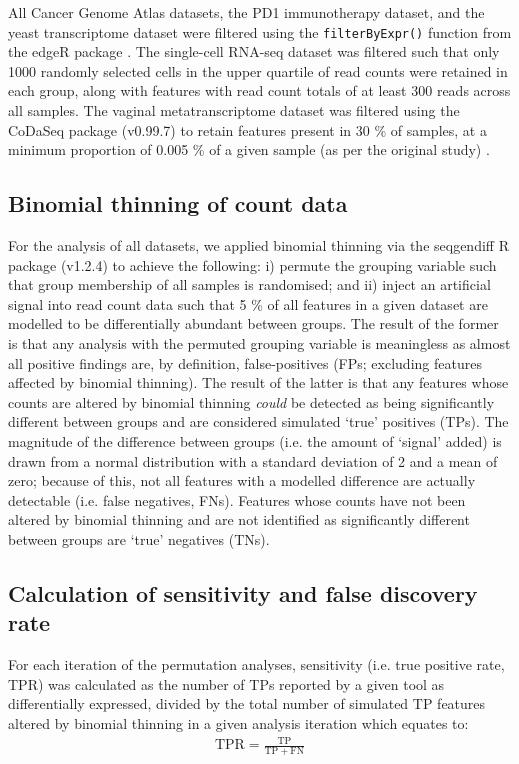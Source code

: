 \documentclass{article}
\begin{document}
All Cancer Genome Atlas datasets, the PD1 immunotherapy dataset, and the yeast transcriptome dataset were filtered using the \texttt{filterByExpr()} function from the edgeR package \cite{robinson_edger_2010}. The single-cell RNA-seq dataset was filtered such that only 1000 randomly selected cells in the upper quartile of read counts were retained in each group, along with features with read count totals of at least 300 reads across all samples. The vaginal metatranscriptome dataset was filtered using the CoDaSeq package (v0.99.7) \cite{gloor_codaseq} to retain features present in 30 \% of samples, at a minimum proportion of 0.005 \% of a given sample (as per the original study) \cite{dos_santos_vaginal_2024}.

\subsection{Binomial thinning of count data}
For the analysis of all datasets, we applied binomial thinning via the seqgendiff R package (v1.2.4) \cite{gerard_data-based_2020} to achieve the following: i) permute the grouping variable such that group membership of all samples is randomised; and ii) inject an artificial signal into read count data such that 5 \% of all features in a given dataset are modelled to be differentially abundant between groups. The result of the former is that any analysis with the permuted grouping variable is meaningless as almost all positive findings are, by definition, false-positives (FPs; excluding features affected by binomial thinning). The result of the latter is that any features whose counts are altered by binomial thinning \emph{could} be detected as being significantly different between groups and are considered simulated `true' positives (TPs). The magnitude of the difference between groups (i.e. the amount of `signal' added) is drawn from a normal distribution with a standard deviation of 2 and a mean of zero; because of this, not all features with a modelled difference are actually detectable (i.e. false negatives, FNs). Features whose counts have not been altered by binomial thinning and are not identified as significantly different between groups are `true' negatives (TNs).

\subsection{Calculation of sensitivity and false discovery rate}
For each iteration of the permutation analyses, sensitivity (i.e. true positive rate, TPR) was calculated as the number of TPs reported by a given tool as differentially expressed, divided by the total number of simulated TP features altered by binomial thinning in a given analysis iteration which equates to:
\begin{eqnarray}
	\label{eq:TPR}
	\mathrm{TPR} = \frac{\mathrm{TP}}{\mathrm{TP} + \mathrm{FN}}
 \end{eqnarray}
 
\end{document}
